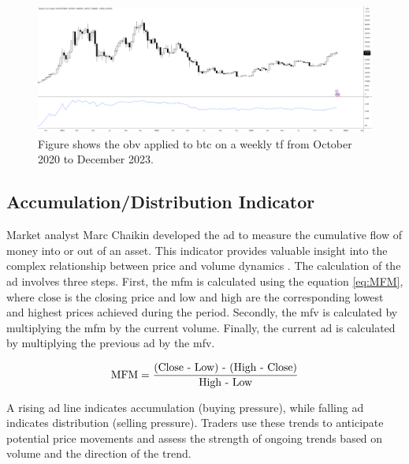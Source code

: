 \begin{figure}[ht]
    \centering
    \includegraphics[width=\textwidth]{./assets/img/btc-obv.png}
    \caption{Figure shows the \gls{obv} applied to \gls{btc} on a weekly \gls{tf} from October 2020 to December 2023.}
    \label{fig:obv}
\end{figure}

\subsection{Accumulation/Distribution Indicator}
\label{sub:AD}

Market analyst Marc Chaikin developed the \gls{ad} to measure the cumulative flow of money into or out of an asset. This indicator provides valuable insight into the complex relationship between price and volume dynamics \citep{Yu_2023}.
\newline
\newline
The calculation of the \gls{ad} involves three steps. First, the \gls{mfm} is calculated using the equation \ref{eq:MFM}, where $\text{close}$ is the closing price and $\text{low}$ and $\text{high}$ are the corresponding lowest and highest prices achieved during the period. Secondly, the \gls{mfv} is calculated by multiplying the \gls{mfm} by the current volume. Finally, the current \gls{ad} is calculated by multiplying the previous \gls{ad} by the \gls{mfv}.

\begin{equation}
    \centering
    \text{MFM} = \frac{\text{(Close - Low) - (High - Close)}}{\text{High - Low}}
    \label{eq:MFM}
\end{equation}

\noindent
A rising \gls{ad} line indicates accumulation (buying pressure), while falling \gls{ad} indicates distribution (selling pressure). Traders use these trends to anticipate potential price movements and assess the strength of ongoing trends based on volume and the direction of the trend.

